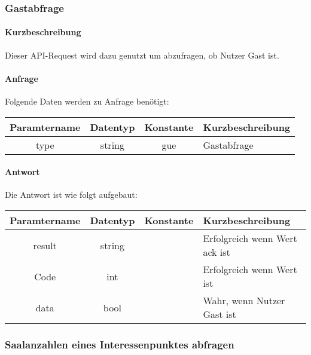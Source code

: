 \subsubsection{Gastabfrage}
\paragraph{Kurzbeschreibung}Dieser API-Request wird dazu genutzt um abzufragen, ob Nutzer Gast ist.
\paragraph{Anfrage}Folgende Daten werden zu Anfrage benötigt:
\begin{table}[H]
	\begin{tabular}{|c|c|c|p{6.5cm}|}
		\hline
		\textbf{Paramtername} & \textbf{Datentyp} & \textbf{Konstante} & \textbf{Kurzbeschreibung}                                                                                               \\ \hline
		type                & string            & gue                & Gastabfrage \\ \hline
	\end{tabular}
\end{table}
\paragraph{Antwort}Die Antwort ist wie folgt aufgebaut:
\begin{table}[H]
	\begin{tabular}{|c|c|c|p{6.5cm}|}
		\hline
		\textbf{Paramtername} & \textbf{Datentyp} & \textbf{Konstante} & \textbf{Kurzbeschreibung}                                                                                               \\ \hline
		result              & string           &                 & Erfolgreich wenn Wert {\glqq ack\grqq} ist \\ \hline
		Code                & int              &                 & Erfolgreich wenn Wert {\glqq 0\grqq} ist \\ \hline
		data                & bool             &                 & Wahr, wenn Nutzer Gast ist \\ \hline
	\end{tabular}
\end{table}

\subsubsection{Saalanzahlen eines Interessenpunktes abfragen}
